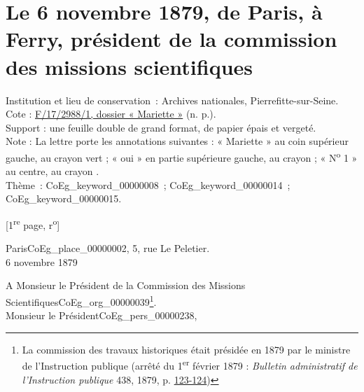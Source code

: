 \documentclass{book}
\begin{document}
{\hypertarget{CoEg_Mariette_1879-11-06}{}

\section*{Le 6 novembre 1879, de Paris, à Ferry, président de la commission des missions scientifiques}
 \label{labCoEg_Mariette_1879-11-06}
{\footnotesize
\noindent Institution et lieu de conservation~: Archives nationales, Pierrefitte-sur-Seine.\\
Cote : \hyperlink{CoEg_Mariette_ms_002}{F/17/2988/1, dossier « Mariette »} (n. p.).\\
Support : une feuille double de grand format, de papier épais et vergeté.\\
Note : La lettre porte les annotations suivantes : « Mariette » au coin supérieur gauche, au crayon vert ; « oui » en partie supérieure gauche, au crayon ; « N\textsuperscript{o} 1 » au centre, au crayon .\\
Thème~: \gls{CoEg_keyword_00000008}~; \gls{CoEg_keyword_00000014}~; \gls{CoEg_keyword_00000015}.}

{\footnotesize \begin{center} [1\textsuperscript{re} page, r\textsuperscript{o}]\end{center}}
\begin{flushright}Paris\gls{CoEg_place_00000002}, 5, rue Le Peletier.\\
6 novembre 1879\end{flushright}
\indent A Monsieur le Président de la Commission des Missions\\
\indent Scientifiques\gls{CoEg_org_00000039}\footnote{La commission des travaux historiques était présidée en 1879 par le ministre de l’Instruction publique (arrêté du 1\textsuperscript{er} février 1879 : \textit{Bulletin administratif de l’Instruction publique} 438, 1879, p. \href{https://education.persee.fr/doc/baip_1254-0714_1879_num_22_438_59593}{123-124})}.\\

\hspace{1cm} Monsieur le Président\gls{CoEg_pers_00000238},\\

}
\end{document}
